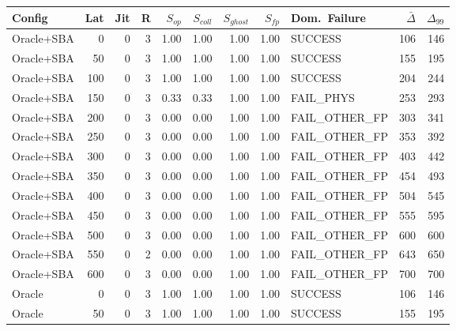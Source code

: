 \begin{tabular}{lrrr|rrrr|lrr}
  Config & Lat & Jit & R & $S_{op}$ & $S_{coll}$ & $S_{ghost}$ & $S_{fp}$ & Dom.~Failure & $\bar{\Delta}$ & $\Delta_{99}$ \\
  \hline
  Oracle+SBA                     &    0 &    0 &   3 & 1.00 & 1.00 & 1.00 & 1.00 & SUCCESS         &   106 &   146 \\
  Oracle+SBA                     &   50 &    0 &   3 & 1.00 & 1.00 & 1.00 & 1.00 & SUCCESS         &   155 &   195 \\
  Oracle+SBA                     &  100 &    0 &   3 & 1.00 & 1.00 & 1.00 & 1.00 & SUCCESS         &   204 &   244 \\
  Oracle+SBA                     &  150 &    0 &   3 & 0.33 & 0.33 & 1.00 & 1.00 & FAIL_PHYS       &   253 &   293 \\
  Oracle+SBA                     &  200 &    0 &   3 & 0.00 & 0.00 & 1.00 & 1.00 & FAIL_OTHER_FP   &   303 &   341 \\
  Oracle+SBA                     &  250 &    0 &   3 & 0.00 & 0.00 & 1.00 & 1.00 & FAIL_OTHER_FP   &   353 &   392 \\
  Oracle+SBA                     &  300 &    0 &   3 & 0.00 & 0.00 & 1.00 & 1.00 & FAIL_OTHER_FP   &   403 &   442 \\
  Oracle+SBA                     &  350 &    0 &   3 & 0.00 & 0.00 & 1.00 & 1.00 & FAIL_OTHER_FP   &   454 &   493 \\
  Oracle+SBA                     &  400 &    0 &   3 & 0.00 & 0.00 & 1.00 & 1.00 & FAIL_OTHER_FP   &   504 &   545 \\
  Oracle+SBA                     &  450 &    0 &   3 & 0.00 & 0.00 & 1.00 & 1.00 & FAIL_OTHER_FP   &   555 &   595 \\
  Oracle+SBA                     &  500 &    0 &   3 & 0.00 & 0.00 & 1.00 & 1.00 & FAIL_OTHER_FP   &   600 &   600 \\
  Oracle+SBA                     &  550 &    0 &   2 & 0.00 & 0.00 & 1.00 & 1.00 & FAIL_OTHER_FP   &   643 &   650 \\
  Oracle+SBA                     &  600 &    0 &   3 & 0.00 & 0.00 & 1.00 & 1.00 & FAIL_OTHER_FP   &   700 &   700 \\
  Oracle                         &    0 &    0 &   3 & 1.00 & 1.00 & 1.00 & 1.00 & SUCCESS         &   106 &   146 \\
  Oracle                         &   50 &    0 &   3 & 1.00 & 1.00 & 1.00 & 1.00 & SUCCESS         &   155 &   195 \\

\end{tabular}
